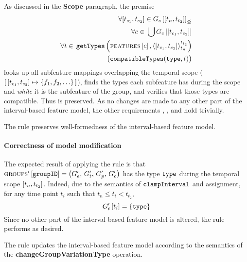 As discussed in the \textbf{Scope} paragraph, the premise 
\[
   \begin{split}
        \forall \interval{t_{c_1}}{t_{c_2}} \in \overlapping{G_c}{t_n}{t_{t_2}}\\ %
        \forall c \in \, \bigcup \lookup{G_c}{\interval{t_{c_1}}{t_{c_2}}}\\ %
        \forall t \in \, \var{getTypes}\left(\lookup{\features}{c}, \clamp{\interval{t_{c_1}}{t_{c_2}}}{t_n}{t_{t_2}}\right) \\ %
        \big(\var{compatibleTypes}(\var{type}, t)\big)
   \end{split}
\]
looks up all subfeature mappings overlapping the temporal scope ($\intervalmapping{t_{c_1}}{t_{c_2}}{\set{f_1, f_2, \ldots}}$), finds the types each subfeature has during the scope and \emph{while} it is the subfeature of the group, and verifies that those types are compatible. Thus  is preserved. 
As no changes are made to any other part of the interval-based feature model, the other requirements , , and  hold trivially.
\\

\begin{lemma}
   The  rule preserves well-formedness of the interval-based feature model. 
   \label{lemma:change-group-variation-type-well-formed}
\end{lemma}

\paragraph{Correctness of model modification}
The expected result of applying the rule is that $\textsc{groups}{}' \left[ \texttt{groupID} \right] = \left(G'_e,\, G'_t,\, G'_p,\, G'_c\right)$ has the type $\texttt{type}$ during the temporal scope $\interval{t_n}{t_{t_2}}$. Indeed, due to the semantics of $\texttt{clampInterval}$ and assignment, for any time point $t_i$ such that $t_n \leq t_i < t_{t_2}$,
\[
   G'_t \left[ t_i \right] = \left\{\texttt{type}\right\}
\]
Since no other part of the interval-based feature model is altered, the rule performs as desired.
\\

\begin{lemma}
   The  rule updates the interval-based feature model according to the semantics of the \textbf{changeGroupVariationType} operation.
   \label{lemma:change-group-variation-type-mod}
\end{lemma}
